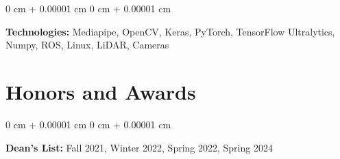 \documentclass[10pt, letterpaper]{article}
\newenvironment{onecolentry}{
    \begin{adjustwidth}{
        0 cm + 0.00001 cm
    }{
        0 cm + 0.00001 cm
    }
}{
    \end{adjustwidth}
} %
\begin{document}
        \vspace{0.2 cm}

        \begin{onecolentry}
            \textbf{Technologies:} Mediapipe, OpenCV, Keras, PyTorch, TensorFlow Ultralytics, Numpy, ROS, Linux, LiDAR, Cameras %
        \end{onecolentry}

    \section{Honors and Awards}
        \begin{onecolentry}
            \textbf{Dean's List: } Fall 2021, Winter 2022, Spring 2022, Spring 2024
        \end{onecolentry}


    
\end{document}
